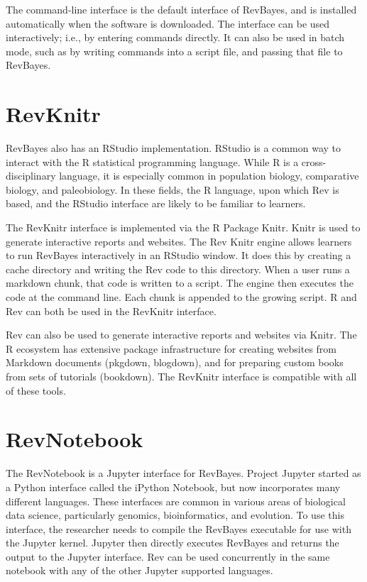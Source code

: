 \documentclass{article}
\begin{document}
The command-line interface is the default interface of RevBayes, and is installed automatically when the software is downloaded.
The interface can be used interactively; i.e., by entering commands directly.
It can also be used in batch mode, such as by writing commands into a script file, and passing that file to RevBayes.

\section{RevKnitr}

RevBayes also has an RStudio implementation. 
RStudio is a common way to interact with the R statistical programming language.
While R is a cross-disciplinary language, it is especially common in population biology, comparative biology, and paleobiology.
In these fields, the R language, upon which Rev is based, and the RStudio interface are likely to be familiar to learners.

The RevKnitr interface is implemented via the R Package Knitr. 
Knitr is used to generate interactive reports and websites.
The Rev Knitr engine allows learners to run RevBayes interactively in an RStudio window.
It does this by creating a cache directory and writing the Rev code to this directory. 
When a user runs a markdown chunk, that code is written to a script. 
The engine then executes the code at the command line.
Each chunk is appended to the growing script.
R and Rev can both be used in the RevKnitr interface.

Rev can also be used to generate interactive reports and websites via Knitr.
The R ecosystem has extensive package infrastructure for creating websites from Markdown documents (pkgdown, blogdown), and for preparing custom books from sets of tutorials (bookdown).
The RevKnitr interface is compatible with all of these tools.

\section{RevNotebook}

The RevNotebook is a Jupyter interface for RevBayes.
Project Jupyter started as a Python interface called the iPython Notebook, but now incorporates many different languages. 
These interfaces are common in various areas of biological data science, particularly genomics, bioinformatics, and evolution.
To use this interface, the researcher needs to compile the RevBayes executable for use with the Jupyter kernel.
Jupyter then directly executes RevBayes and returns the output to the Jupyter interface.
Rev can be used concurrently in the same notebook with any of the other Jupyter supported languages.
\end{document}
